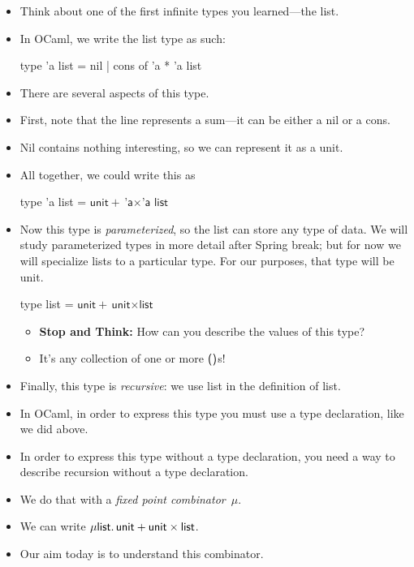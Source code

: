 \documentclass{lecturenotes}
\newcommand{\utype}{\textsf{unit}\xspace}
\newcommand{\unit}{\ensuremath{\textsf{(}\mkern0.5mu\textsf{)}}}
\newcommand{\prodtype}[2]{\ensuremath{#1 \times #2}}
\newcommand{\sumtype}[2]{\ensuremath{#1 + #2}}
\newcommand{\rectype}[2]{\ensuremath{\mu #1.\,#2}}
\begin{document}
\begin{itemize}
\item Think about one of the first infinite types you learned---the list.
\item In OCaml, we write the list type as such:
  \begin{center}
    {\sffamily
      type 'a list = nil | cons of 'a * 'a list
    }
  \end{center}
\item There are several aspects of this type.
\item First, note that the line represents a sum---it can be either a nil or a cons.
\item Nil contains nothing interesting, so we can represent it as a unit.
\item All together, we could write this as
  \begin{center}
    {\sffamily
      type 'a list = \sumtype{\utype}{\prodtype{\textsf{'a}}{\textsf{'a list}}}
    }
  \end{center}
\item Now this type is \emph{parameterized}, so the list can store any type of data.
  We will study parameterized types in more detail after Spring break; but for now we will specialize lists to a particular type.
  For our purposes, that type will be \utype.
  \begin{center}
    {\sffamily
      type list = \sumtype{\utype}{\prodtype{\utype}{\textsf{list}}}
    }
  \end{center}
  \begin{itemize}
  \item \textbf{Stop and Think:} How can you describe the values of this type?
  \item It's any collection of one or more $\unit$s!
  \end{itemize}
\item Finally, this type is \emph{recursive}: we use \textsf{list} in the definition of \textsf{list}.
\item In OCaml, in order to express this type you must use a type declaration, like we did above.
\item In order to express this type without a type declaration, you need a way to describe recursion without a type declaration.
\item We do that with a \emph{fixed point combinator}~$\mu$.
\item We can write $\rectype{\textsf{list}}{\sumtype{\utype}\prodtype{\utype}{\textsf{list}}}$.
\item Our aim today is to understand this combinator.
\end{itemize}
\end{document}
